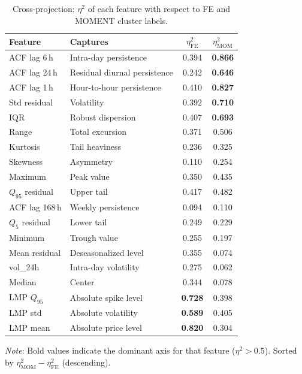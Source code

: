 \documentclass[12pt]{article}
\begin{document}
\begin{table}[H]
\centering
\caption{Cross-projection: $\eta^2$ of each feature with respect to FE and MOMENT cluster labels.}
\label{tab:cross_projection}
\small
\begin{tabular}{llcc}
\toprule
Feature & Captures & $\eta^2_\text{FE}$ & $\eta^2_\text{MOM}$ \\
\midrule
ACF lag 6\,h     & Intra-day persistence       & 0.394 & \textbf{0.866} \\
ACF lag 24\,h    & Residual diurnal persistence & 0.242 & \textbf{0.646} \\
ACF lag 1\,h     & Hour-to-hour persistence     & 0.410 & \textbf{0.827} \\
Std residual     & Volatility                   & 0.392 & \textbf{0.710} \\
IQR              & Robust dispersion            & 0.407 & \textbf{0.693} \\
Range            & Total excursion              & 0.371 & 0.506 \\
Kurtosis         & Tail heaviness               & 0.236 & 0.325 \\
Skewness         & Asymmetry                    & 0.110 & 0.254 \\
Maximum          & Peak value                   & 0.350 & 0.435 \\
$Q_{95}$ residual & Upper tail                  & 0.417 & 0.482 \\
ACF lag 168\,h   & Weekly persistence           & 0.094 & 0.110 \\
$Q_5$ residual   & Lower tail                   & 0.249 & 0.229 \\
Minimum          & Trough value                 & 0.255 & 0.197 \\
Mean residual    & Deseasonalized level         & 0.355 & 0.074 \\
vol\_24h         & Intra-day volatility         & 0.275 & 0.062 \\
Median           & Center                       & 0.344 & 0.078 \\
LMP $Q_{95}$     & Absolute spike level         & \textbf{0.728} & 0.398 \\
LMP std          & Absolute volatility          & \textbf{0.589} & 0.405 \\
LMP mean         & Absolute price level         & \textbf{0.820} & 0.304 \\
\bottomrule
\end{tabular}

\medskip
\small
\textit{Note}: Bold values indicate the dominant axis for that feature ($\eta^2 > 0.5$). Sorted by $\eta^2_\text{MOM} - \eta^2_\text{FE}$ (descending).
\end{table}
\end{document}
